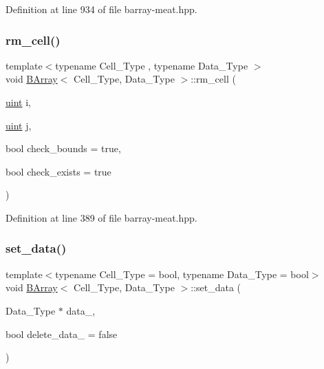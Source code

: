 Definition at line 934 of file barray-\/meat.\+hpp.

\mbox{\label{class_b_array_aaead894ff275479db4f733793ce037db}} 
\subsubsection{\texorpdfstring{rm\+\_\+cell()}{rm\_cell()}}
{\footnotesize\ttfamily template$<$typename Cell\+\_\+\+Type , typename Data\+\_\+\+Type $>$ \\
void \hyperlink{class_b_array}{B\+Array}$<$ Cell\+\_\+\+Type, Data\+\_\+\+Type $>$\+::rm\+\_\+cell (\begin{DoxyParamCaption}\item[{\hyperlink{typedefs_8hpp_a91ad9478d81a7aaf2593e8d9c3d06a14}{uint}}]{i,  }\item[{\hyperlink{typedefs_8hpp_a91ad9478d81a7aaf2593e8d9c3d06a14}{uint}}]{j,  }\item[{bool}]{check\+\_\+bounds = {\ttfamily true},  }\item[{bool}]{check\+\_\+exists = {\ttfamily true} }\end{DoxyParamCaption})\hspace{0.3cm}{\ttfamily [inline]}}



Definition at line 389 of file barray-\/meat.\+hpp.

\mbox{\label{class_b_array_accf44b49caa7746a462a3ac9b6024cfc}} 
\subsubsection{\texorpdfstring{set\+\_\+data()}{set\_data()}}
{\footnotesize\ttfamily template$<$typename Cell\+\_\+\+Type = bool, typename Data\+\_\+\+Type = bool$>$ \\
void \hyperlink{class_b_array}{B\+Array}$<$ Cell\+\_\+\+Type, Data\+\_\+\+Type $>$\+::set\+\_\+data (\begin{DoxyParamCaption}\item[{Data\+\_\+\+Type $\ast$}]{data\+\_\+,  }\item[{bool}]{delete\+\_\+data\+\_\+ = {\ttfamily false} }\end{DoxyParamCaption})\hspace{0.3cm}{\ttfamily [inline]}}



